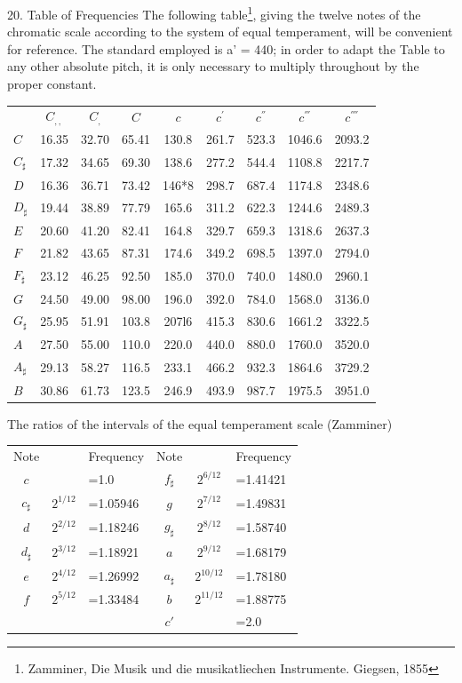 20.  Table of Frequencies The following table\footnote{Zamminer, Die Musik und
die musikatliechen Instrumente. Giegsen, 1855}, giving the twelve notes of the
chromatic scale according to the system of equal temperament, will be
convenient for reference. The standard employed is a' = 440; in order to adapt
the Table to any other absolute pitch, it is only necessary to multiply
throughout by the proper constant.

\begin{tabular}{lcccccccc} & \(C_{,,}\) & \(C_{,}\) & \(C\) & \(c\) & \(c^{'}\)
& \(c^{''}\) & \(c^{'''}\) & \(c^{''''}\) \\ \(C\) & 16.35 & 32.70 & 65.41 &
130.8 & 261.7 & 523.3 & 1046.6 & 2093.2 \\ \(C_{\sharp}\) & 17.32 & 34.65 &
69.30 & 138.6 & 277.2 & 544.4 & 1108.8 & 2217.7\\ \(D\) & 16.36 & 36.71 & 73.42
& 146*8 & 298.7 & 687.4 & 1174.8 & 2348.6\\ \(D_{\sharp}\) & 19.44 & 38.89 &
77.79 & 165.6 & 311.2 & 622.3 & 1244.6 & 2489.3\\ \(E\) & 20.60 & 41.20 & 82.41
& 164.8 & 329.7 & 659.3 & 1318.6 & 2637.3\\ \(F\) & 21.82 & 43.65 & 87.31 &
174.6 & 349.2 & 698.5 & 1397.0 & 2794.0\\ \(F_{\sharp}\) & 23.12 & 46.25 &
92.50 & 185.0 & 370.0 & 740.0 & 1480.0 & 2960.1\\ \(G\) & 24.50 & 49.00 & 98.00
& 196.0 & 392.0 & 784.0 & 1568.0 & 3136.0\\ \(G_{\sharp}\) & 25.95 & 51.91 &
103.8 & 207l6 & 415.3 & 830.6 & 1661.2 & 3322.5\\ \(A\) & 27.50 & 55.00 & 110.0
& 220.0 & 440.0 & 880.0 & 1760.0 & 3520.0\\ \(A_{\sharp}\) & 29.13 & 58.27 &
116.5 & 233.1 & 466.2 & 932.3 & 1864.6 & 3729.2\\ \(B\) & 30.86 & 61.73 & 123.5
& 246.9 & 493.9 & 987.7 & 1975.5 & 3951.0\\
\end{tabular}

The ratios of the intervals of the equal temperament scale (Zamminer)

\begin{tabular}{cclccl} Note&        &Frequency&Note&        &Frequency \\
\(c\)   &        &=1.0   &\(f_{\sharp}\)   &\(2^{6/12}\)&=1.41421 \\
\(c_{\sharp}\)  &\(2^{1/12}\)&=1.05946&\(g\)    &\(2^{7/12}\)&=1.49831 \\ \(d\)
&\(2^{2/12}\)&=1.18246&\(g_{\sharp}\)   &\(2^{8/12}\)&=1.58740 \\
\(d_{\sharp}\)  &\(2^{3/12}\)&=1.18921&\(a\)    &\(2^{9/12}\)&=1.68179 \\ \(e\)
&\(2^{4/12}\)&=1.26992&\(a_{\sharp}\)   &\(2^{10/12}\)&=1.78180 \\ \(f\)
&\(2^{5/12}\)&=1.33484&\(b\)    &\(2^{11/12}\)&=1.88775 \\ &        &
&\(c'\)   &         &=2.0\\
\end{tabular}

